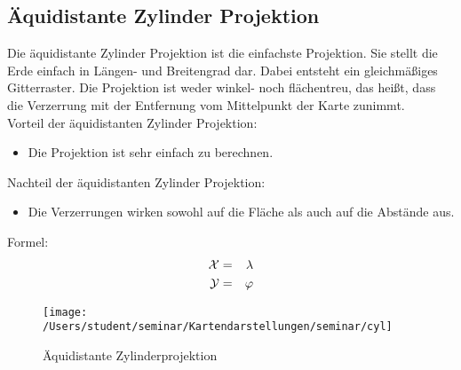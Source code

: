 \subsection{Äquidistante Zylinder Projektion}
\label{sec:aequizylinder} 
Die äquidistante Zylinder Projektion ist die einfachste Projektion. Sie stellt die Erde einfach in Längen- und Breitengrad dar. Dabei entsteht ein gleichmäßiges Gitterraster. Die Projektion ist weder winkel- noch flächentreu, das heißt, dass die Verzerrung mit der Entfernung vom Mittelpunkt der Karte zunimmt.\\ 
Vorteil der äquidistanten Zylinder Projektion:
\begin{itemize}
\item Die Projektion ist sehr einfach zu berechnen.
\end{itemize}
Nachteil der äquidistanten Zylinder Projektion:\\
\begin{itemize}
\item Die Verzerrungen wirken sowohl auf die Fläche als auch auf die Abstände aus.
\end{itemize}

Formel:\\
\begin{eqnarray*}
\cal{X} & = & \lambda\\
\cal{Y} & = & \varphi
\end{eqnarray*}

\begin{figure}[hbtp]
\centering
\texttt{[image: /Users/student/seminar/Kartendarstellungen/seminar/cyl]}\\
\caption{Äquidistante Zylinderprojektion}
\end{figure}
 \newpage 